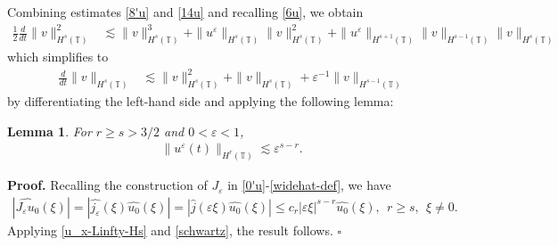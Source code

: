 \documentclass[12pt,reqno]{amsart}
\renewcommand{\qedsymbol}{\ensuremath{\square}}
\newcommand{\ci}{\mathbb{T}}
\newcommand{\ee}{\varepsilon}
\theoremstyle{plain}  %
\newtheorem{lemma}{Lemma}
\theoremstyle{definition}
\begin{document}
%
%
Combining estimates \eqref{8'u} and \eqref{14u} and recalling
\eqref{6u}, we obtain
%
%
\begin{equation*}
\begin{split}
\frac{1}{2}\frac{d}{dt}\|v\|_{H^{s}(\ci)}^2
& \lesssim \|v\|_{H^s(\ci)}^3 + \|u^\ee\|_{H^s(\ci)}
\|v\|_{H^s(\ci)}^2
 + \|u^\ee\|_{H^{s+1}(\ci)}
\|v\|_{H^{s-1}(\ci)} \|v\|_{H^s(\ci)}
\end{split}
\end{equation*}
%
%
which simplifies to 
\begin{equation}
\begin{split}
\frac{d}{dt}\|v\|_{H^{s}(\ci)}
& \lesssim \|v\|_{H^s(\ci)}^2 + 
\|v\|_{H^s(\ci)}
+ \ee^{-1}
\|v\|_{H^{s-1}(\ci)} 
\label{15u}
\end{split}
\end{equation}
by differentiating the left-hand side and applying the following lemma:
%
%
%
\begin{lemma}
\label{lem5r}
For $r \ge s > 3/2$ and $0 < \ee <1$, 
%
%
\begin{equation}
\begin{split}
\|u^{\ee} (t) \|_{H^r(\ci)} \lesssim \ee^{s-r}.
\label{700r}
\end{split}
\end{equation}
%
%
\end{lemma}
%
%
{\bf Proof.} Recalling the construction of $J_\ee$ in 
\eqref{0'u}-\eqref{widehat-def},  we have
%
%
\begin{equation}
\label{schwartz}
\begin{split}
	|\widehat{J_\ee u_0}(\xi)| = |\widehat{j_\ee}(\xi) \widehat{u_0}(\xi)|
	= |\widehat{j }(\ee \xi) \widehat{u_0}(\xi)| \le c_r |\ee \xi 
	|^{s-r} \widehat{u_0}(\xi), \ \ r \ge s, \ \ \xi \neq 0.
\end{split}
\end{equation}
%
%
Applying \eqref{u_x-Linfty-Hs} and \eqref{schwartz}, the result follows.
\qquad \qedsymbol
%
%
%
\end{document}
